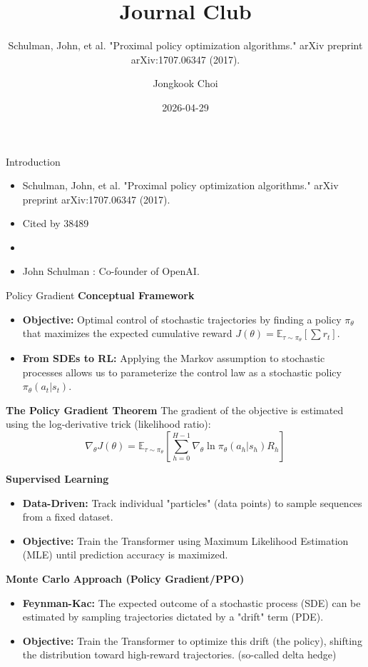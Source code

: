 \documentclass[]{beamer}
\title{Journal Club}
\subtitle{Schulman, John, et al. "Proximal policy optimization algorithms." arXiv preprint arXiv:1707.06347 (2017).}
\author{Jongkook Choi}
\date{2026-04-29}
\begin{document}
\frame{\titlepage}

\begin{frame}{Introduction}

    \begin{itemize}
        \item Schulman, John, et al. "Proximal policy optimization algorithms." arXiv preprint arXiv:1707.06347 (2017).
        \item Cited by 38489
        \item[] 
        \item John Schulman : Co-founder of OpenAI.
    \end{itemize}

\end{frame}

\begin{frame}{Policy Gradient}
    \textbf{Conceptual Framework}
    \begin{itemize}
        \item \textbf{Objective:} Optimal control of stochastic trajectories by finding a policy $\pi_{\theta}$ that maximizes the expected cumulative reward $J(\theta) = \mathbb{E}_{\tau \sim \pi_{\theta}}[\sum r_t]$.
        \item \textbf{From SDEs to RL:} Applying the Markov assumption to stochastic processes allows us to parameterize the control law as a stochastic policy $\pi_{\theta}(a_t | s_t)$.
    \end{itemize}

    \textbf{The Policy Gradient Theorem}
    The gradient of the objective is estimated using the log-derivative trick (likelihood ratio):
    $$ \nabla_{\theta} J(\theta) = \mathbb{E}_{\tau \sim \pi_{\theta}} \left[ \sum_{h=0}^{H-1} \nabla_{\theta} \ln \pi_{\theta}(a_h | s_h) R_h \right] $$

\end{frame}

\begin{frame}{}
    \textbf{Supervised Learning}
    \begin{itemize}
        \item \textbf{Data-Driven:} Track individual "particles" (data points) to sample sequences from a fixed dataset.
        \item \textbf{Objective:} Train the Transformer using Maximum Likelihood Estimation (MLE) until prediction accuracy is maximized.
    \end{itemize}
    
    \vfill
    
    \textbf{Monte Carlo Approach (Policy Gradient/PPO)}
    \begin{itemize}
        \item \textbf{Feynman-Kac:} The expected outcome of a stochastic process (SDE) can be estimated by sampling trajectories dictated by a "drift" term (PDE).
        \item \textbf{Objective:} Train the Transformer to optimize this drift (the policy), shifting the distribution toward high-reward trajectories. (so-called delta hedge)
    \end{itemize}
\end{frame}
\end{document}
